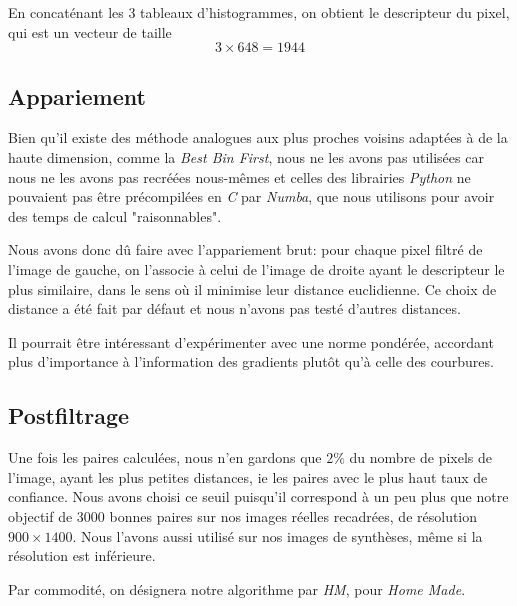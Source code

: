 \documentclass[
	a4paper, %
	10pt, %
	unnumberedsections, %
	twoside, %
]{LTJournalArticle}
\begin{document}
En concaténant les $3$ tableaux d'histogrammes, on obtient le descripteur du pixel,
qui est un vecteur de taille $$3 \times 648 = 1944$$


\subsection{Appariement}

Bien qu'il existe des méthode analogues aux plus proches voisins adaptées à de la haute dimension,
comme la \textit{Best Bin First}, nous ne les avons pas utilisées car nous ne les avons pas
recréées nous-mêmes et celles des librairies \textit{Python} ne pouvaient pas être
précompilées en \textit{C} par \textit{Numba}, que nous utilisons pour avoir des temps
de calcul "raisonnables".

Nous avons donc dû faire avec l'appariement brut: pour chaque pixel filtré de l'image de gauche,
on l'associe à celui de l'image de droite ayant le descripteur le plus similaire,
dans le sens où il minimise leur distance euclidienne.
Ce choix de distance a été fait par défaut et nous n'avons pas testé d'autres distances.

Il pourrait être intéressant d'expérimenter avec une norme pondérée, accordant plus d'importance
à l'information des gradients plutôt qu'à celle des courbures.

\subsection{Postfiltrage}
Une fois les paires calculées, nous n'en gardons que $2 \%$ du nombre de pixels de l'image,
ayant les plus petites distances, ie les paires avec le plus haut taux
de confiance. Nous avons choisi ce seuil puisqu'il correspond à un peu plus que
notre objectif de $3000$ bonnes paires sur nos images réelles recadrées, de résolution
$900 \times 1400$.
Nous l'avons aussi
utilisé sur nos images de synthèses, même si la résolution est inférieure.

Par commodité, on désignera notre algorithme
par \textit{HM}, pour \textit{Home Made}.

\end{document}
